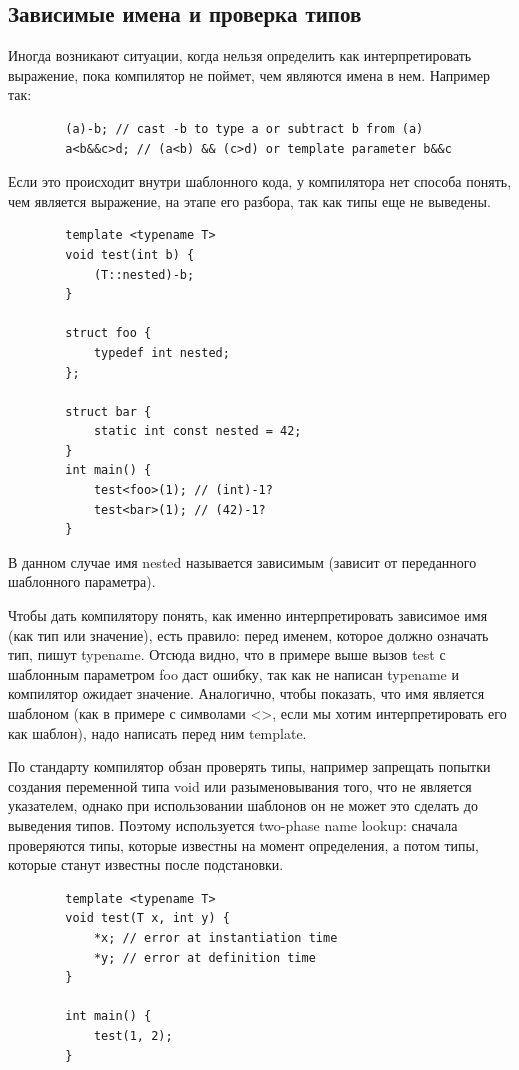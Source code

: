 \documentclass[12pt, a4paper]{article}
\begin{document}
	\subsection{Зависимые имена и проверка типов}
	\par Иногда возникают ситуации, когда нельзя определить как интерпретировать выражение, пока компилятор не поймет, чем являются имена в нем. Например так:
	\begin{verbatim}
		(a)-b; // cast -b to type a or subtract b from (a)
		a<b&&c>d; // (a<b) && (c>d) or template parameter b&&c
	\end{verbatim}
	Если это происходит внутри шаблонного кода, у компилятора нет способа понять, чем является выражение, на этапе его разбора, так как типы еще не выведены. 
	\begin{verbatim}
		template <typename T>
		void test(int b) {
			(T::nested)-b;
		}
		
		struct foo {
			typedef int nested;
		};
		
		struct bar {
			static int const nested = 42;
		}
		int main() {
			test<foo>(1); // (int)-1?
			test<bar>(1); // (42)-1?
		}
	\end{verbatim}
	В данном случае имя nested называется зависимым (зависит от переданного шаблонного параметра).
	\par Чтобы дать компилятору понять, как именно интерпретировать зависимое имя (как тип или значение), есть правило: перед именем, которое должно означать тип, пишут typename. Отсюда видно, что в примере выше вызов test с шаблонным параметром foo даст ошибку, так как не написан typename и компилятор ожидает значение. Аналогично, чтобы показать, что имя является шаблоном (как в примере с символами <>, если мы хотим интерпретировать его как шаблон), надо написать перед ним template.
	\\\par По стандарту компилятор обзан проверять типы, например запрещать попытки создания переменной типа void или разыменовывания того, что не является указателем, однако при использовании шаблонов он не может это сделать до выведения типов. Поэтому используется two-phase name lookup: сначала проверяются типы, которые известны на момент определения, а потом типы, которые станут известны после подстановки.
	\begin{verbatim}
		template <typename T>
		void test(T x, int y) {
			*x; // error at instantiation time
			*y; // error at definition time
		}
		
		int main() {
			test(1, 2);
		}
	\end{verbatim}
\end{document}
